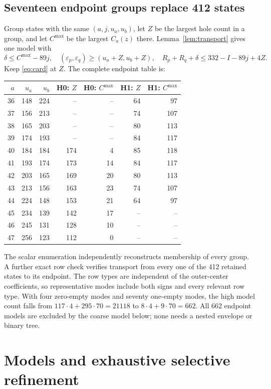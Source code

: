 \documentclass[11pt,a4paper]{article}
\begin{document}
\subsection{Seventeen endpoint groups replace 412 states}
Group states with the same $(a,j,u_a,u_b)$, let $Z$ be the largest
hole count in a group, and let $C^{\max}$ be the largest $C_a(z)$ there.
Lemma~\ref{lem:transport} gives one model with
\[
 \delta\le C^{\max}-89j,\quad
 (\varepsilon_p,\varepsilon_q)\ge(u_a+Z,u_b+Z),\quad
 R_p+R_q+\delta\le332-I-89j+4Z.
\]
Keep \eqref{eq:card} at $Z$. The complete endpoint table is:
\begin{center}\small
\begin{tabular}{rrrrrrr}
\toprule
$a$&$u_a$&$u_b$&H0: $Z$&H0: $C^{\max}$&H1: $Z$&H1: $C^{\max}$\\
\midrule
36&148&224&--&--&64&97\\
37&156&213&--&--&74&107\\
38&165&203&--&--&80&113\\
39&174&193&--&--&84&117\\
40&184&184&174&4&85&118\\
41&193&174&173&14&84&117\\
42&203&165&169&20&80&113\\
43&213&156&163&23&74&107\\
44&224&148&153&21&64&97\\
45&234&139&142&17&--&--\\
46&245&131&128&10&--&--\\
47&256&123&112&0&--&--\\
\bottomrule
\end{tabular}
\end{center}
The scalar enumeration independently reconstructs membership of every
group. A further exact row check verifies transport from every one of
the 412 retained states to its endpoint. The row types are independent
of the outer-center coefficients, so representative modes include both
signs and every relevant row type.
With four zero-empty modes and seventy one-empty modes, the high model
count falls from $117\cdot4+295\cdot70=21118$ to
$8\cdot4+9\cdot70=662$. All 662 endpoint models are excluded by the
coarse model below; none needs a nested envelope or binary tree.

\section{Models and exhaustive selective refinement}
\end{document}
